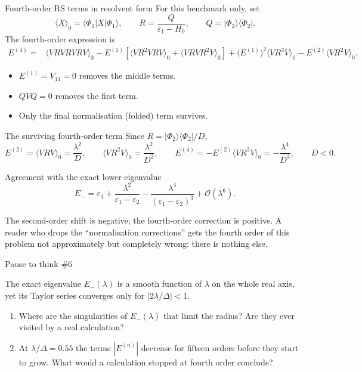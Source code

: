 \documentclass[aspectratio=169,10pt]{beamer}
\newcounter{thinkctr}
\newcommand{\thinkq}[2]{%
  \stepcounter{thinkctr}%
  \vfill
  \begin{tcolorbox}[enhanced,colback=palewarm,colframe=warm,boxrule=1.2pt,arc=4pt,
    grow to left by=6mm,grow to right by=6mm,
    left=16pt,right=16pt,top=16pt,bottom=18pt,
    fonttitle=\bfseries\Large,fontupper=\Large,
    title={Pause to think \#\thethinkctr\hfill\mdseries\normalsize(about #1 min -- discuss with your neighbour)}]
  #2
  \end{tcolorbox}
  \vfill}
\newcommand{\ket}[1]{\vert #1\rangle}
\newcommand{\bra}[1]{\langle #1\vert}
\newcommand{\mel}[3]{\langle #1\lvert #2\rvert #3\rangle}
\newcommand{\av}[1]{\langle #1\rangle_0}
\newcommand{\ord}[1]{\mathcal O(#1)}
\begin{document}
\begin{frame}{Fourth-order RS terms in resolvent form}
For this benchmark only, set
\[
\av{X}=\mel{\Phi_1}{X}{\Phi_1},\qquad
R=\frac{Q}{\varepsilon_1-H_0},\qquad Q=\ket{\Phi_2}\bra{\Phi_2}.
\]
The fourth-order expression is
\begin{align*}
E^{(4)}={}&\av{VRVRVRV}
-E^{(1)}\left[\av{VR^2VRV}+\av{VRVR^2V}\right]
+\bigl(E^{(1)}\bigr)^2\av{VR^3V}
-E^{(2)}\av{VR^2V}.
\end{align*}
\begin{itemize}
\item \(E^{(1)}=V_{11}=0\) removes the middle terms.
\item \(QVQ=0\) removes the first term.
\item Only the final normalisation (folded) term survives.
\end{itemize}
\end{frame}

\begin{frame}{The surviving fourth-order term}
Since \(R=\ket{\Phi_2}\bra{\Phi_2}/D\),
\[
E^{(2)}=\av{VRV}=\frac{\lambda^2}{D},\qquad
\av{VR^2V}=\frac{\lambda^2}{D^2},
\qquad
\boxed{E^{(4)}=-E^{(2)}\av{VR^2V}
=-\frac{\lambda^4}{D^3},\qquad D<0.}
\]
\begin{exampleblock}{Agreement with the exact lower eigenvalue}
\[
E_-=\varepsilon_1+
\frac{\lambda^2}{\varepsilon_1-\varepsilon_2}
-\frac{\lambda^4}{(\varepsilon_1-\varepsilon_2)^3}
+\ord{\lambda^6}.
\]
\end{exampleblock}
\small The second-order shift is negative; the fourth-order correction is positive. A reader who drops the ``normalisation corrections'' gets the fourth order of this problem not approximately but completely wrong: there is nothing else.
\end{frame}

\begin{frame}{Pause to think \#6}
\thinkq{3}{The exact eigenvalue \(E_-(\lambda)\) is a smooth function of \(\lambda\) on the whole real axis, yet its Taylor series converges only for \(|2\lambda/\Delta|<1\).
\begin{enumerate}
\item Where are the singularities of \(E_-(\lambda)\) that limit the radius? Are they ever visited by a real calculation?
\item At \(\lambda/\Delta=0.55\) the terms \(|E^{(n)}|\) decrease for fifteen orders before they start to grow. What would a calculation stopped at fourth order conclude?
\end{enumerate}}
\end{frame}
\end{document}
